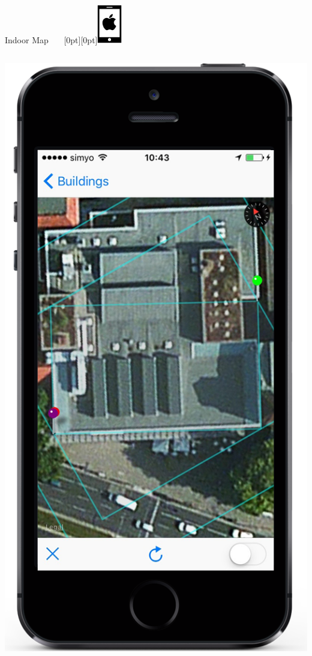 \documentclass[11pt]{beamer}
\begin{document}
\begin{frame}{Indoor Map ~~~\raisebox{-10pt}[0pt][0pt]{\includegraphics[width=0.08\textwidth]{tech-stack-apple}}}
\begin{columns}[T]
\begin{column}{.4\textwidth}
  \includegraphics[scale=0.25]{mapfirststep}
  \end{column}
\end{columns}

\end{frame}
\end{document}
